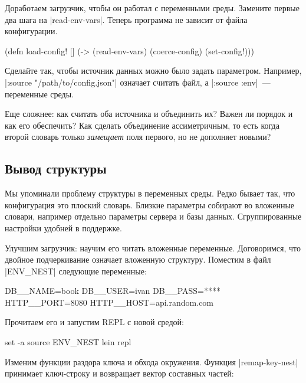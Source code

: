 Доработаем загрузчик, чтобы он работал с переменными среды. Замените первые два
шага на \spverb|read-env-vars|. Теперь программа не зависит от файла
конфигурации.

\begin{english}
  \begin{clojure}
(defn load-config! []
  (-> (read-env-vars)
      (coerce-config)
      (set-config!)))
  \end{clojure}
\end{english}

Сделайте так, чтобы источник данных можно было задать параметром. Например,
\spverb|:source "/path/to/config.json"| означает считать файл, а
\spverb|:source :env|~--- переменные среды.

Еще сложнее: как считать оба источника и объединить их? Важен ли порядок и как
его обеспечить? Как сделать объединение ассиметричным, то есть когда второй
словарь только \emph{замещает} поля первого, но не дополняет новыми?


\subsection{Вывод структуры}

Мы упоминали проблему структуры в переменных среды. Редко бывает так, что
конфигурация это плоский словарь. Близкие параметры собирают во вложенные
словари, например отдельно параметры сервера и базы данных. Сгруппированные
настройки удобней в поддержке.

Улучшим загрузчик: научим его читать вложенные переменные. Договоримся, что
двойное подчеркивание означает вложенную структуру. Поместим в файл
\spverb|ENV_NEST| следующие переменные:

\begin{english}
  \begin{bash}
DB__NAME=book
DB__USER=ivan
DB__PASS=****
HTTP__PORT=8080
HTTP__HOST=api.random.com
  \end{bash}
\end{english}

\noindent
Прочитаем его и запустим REPL с новой средой:

\begin{english}
  \begin{bash}
set -a
source ENV_NEST
lein repl
  \end{bash}
\end{english}

Изменим функции раздора ключа и обхода окружения. Функция
\spverb|remap-key-nest| принимает ключ-строку и возвращает вектор составных
частей:

